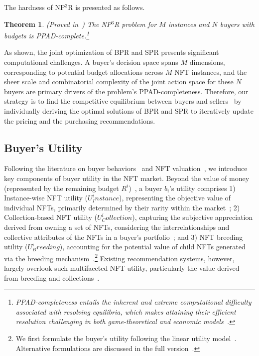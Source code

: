 \documentclass[conference]{IEEEtran}
\theoremstyle{plain}
\newtheorem{theorem}{Theorem}
\begin{document}
The hardness of NP$^3$R is presented as follows.

\begin{theorem}
\label{thm:ppad} 
    (Proved in~\cite{supplementary}) 
    The NP$^3$R problem for $M$ instances and $N$ buyers with budgets is PPAD-complete.\footnote{PPAD-completeness entails the inherent and extreme computational difficulty associated with resolving equilibria, which makes attaining their efficient resolution challenging in both game-theoretical and economic models~\cite{daskalakis2009complexity}.}

\end{theorem}

As shown, the joint optimization of BPR and SPR presents significant computational challenges. A buyer's decision space spans $M$ dimensions, corresponding to potential budget allocations across $M$ NFT instances, and the sheer scale and combinatorial complexity of the joint action space for these $N$ buyers are primary drivers of the problem's PPAD-completeness. Therefore, our strategy is to find the competitive equilibrium between buyers and sellers~\cite{devanur2008market} by individually deriving the optimal solutions of BPR and SPR to iteratively update the pricing and the purchasing recommendations.

\subsection{Buyer's Utility}

    \label{subsec:buyer-utility}
    Following the literature on buyer behaviors~\cite{li2023motivates} and NFT valuation~\cite{costa2023show}, we introduce key components of buyer utility in the NFT market. Beyond the value of money (represented by the remaining budget $R^i$)~\cite{che2000optimal}, a buyer $b_i$'s utility comprises 1) Instance-wise NFT utility ($U^i_Instance$), representing the objective value of individual NFTs, primarily determined by their rarity within the market~\cite{mekacher2022heterogeneous}; 2) Collection-based NFT utility ($U^i_Collection$), capturing the subjective appreciation derived from owning a set of NFTs, considering the interrelationships and collective attributes of the NFTs in a buyer's portfolio~\cite{li2023motivates}; and 3) NFT breeding utility ($U^i_Breeding$), accounting for the potential value of child NFTs generated via the breeding mechanism~\cite{wu2023critical, sawhney2023nike}.\footnote{We first formulate the buyer's utility following the linear utility model~\cite{devanur2008market}. Alternative formulations are discussed in the full version~\cite{supplementary}.} Existing recommendation systems, however, largely overlook such multifaceted NFT utility, particularly the value derived from breeding and collections~\cite{he2020lightgcn, wang2019neural}.
\end{document}
